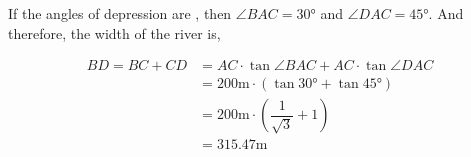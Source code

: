\begin{solution}[\halfpage]
  If the angles of depression are \asif, then $\angle{BAC} = \ang{30}$ and $\angle{DAC} = \ang{45}$.
  And therefore, the width of the river is, 
  
  \begin{align}
  	BD = BC + CD &= AC\cdot\tan\angle{BAC} + AC\cdot\tan\angle{DAC} \\
  	  &= \text{200m}\cdot\left( \tan\ang{30} + \tan\ang{45} \right) \\
  	  &= \text{200m}\cdot\left( \dfrac{1}{\sqrt{3}} + 1\right) \\
  	  &= 315.47\text{m}
  \end{align}
\end{solution}
